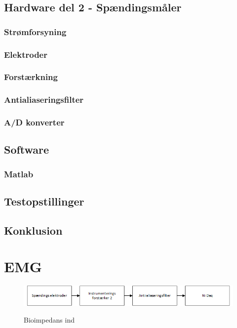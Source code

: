 \documentclass[main.tex]{subfiles}
\begin{document}
\section{Hardware del 2 - Spændingsmåler}
\subsection{Strømforsyning}
\subsection{Elektroder}
\subsection{Forstærkning}
\subsection{Antialiaseringsfilter}
\subsection{A/D konverter}


\section{Software}
\subsection{Matlab}

\section{Testopstillinger}
\section{Konklusion}

\chapter{EMG}


\begin{figure}[H]
\centering
{\includegraphics[width=\linewidth]
{Figure/analyse2}}
\caption{Bioimpedans ind}
\label{analyse2}
\end{figure}
\end{document}
